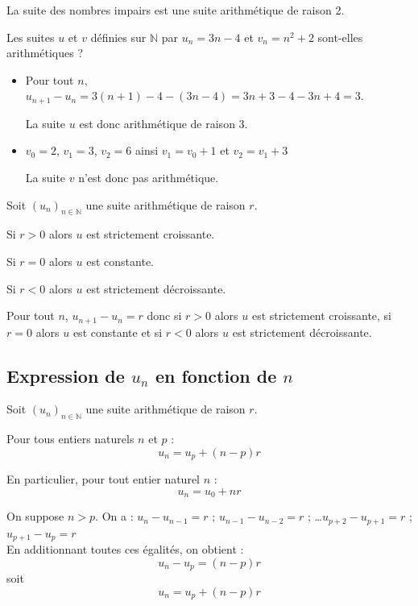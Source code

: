 \documentclass[french]{book}
\newcommand{\N}{\mathbb {N}}
\newcommand{\suite}[1][u]{\left( #1_{n} \right)_{n\in\N}}
\begin{document}
\begin{exemple}
La suite des nombres impairs est une suite arithmétique de raison 2.

Les suites $u$ et $v$ définies sur $\N$ par $u_n=3n-4$ et $v_n=n^2+2$ sont-elles arithmétiques ?

\begin{itemize}
\item Pour tout $n$, $u_{n+1}-u_n=3(n+1)-4-(3n-4)=3n+3-4-3n+4=3$.

La suite $u$ est donc arithmétique de raison 3.

\item $v_0=2$, $v_1=3$, $v_2=6$ ainsi $v_1=v_0+1$ et $v_2=v_1+3$

La suite $v$ n'est donc pas arithmétique.
\end{itemize}
\end{exemple}

\vspace{2ex}
\begin{prop}
Soit $\suite[u]$ une suite arithmétique de raison $r$.
\par Si $r>0$ alors $u$ est strictement croissante.
\par Si $r=0$ alors $u$ est constante.
\par Si $r<0$ alors $u$ est strictement décroissante.
\end{prop}

\begin{demo}
Pour tout $n$, $u_{n+1}-u_n=r$
donc si  $r>0$ alors $u$ est strictement croissante, si $r=0$ alors $u$ est constante et si $r<0$ alors $u$ est strictement décroissante.
\end{demo}
\subsection{Expression de $u_n$ en fonction de $n$}
\begin{prop}
Soit $\suite[u]$ une suite arithmétique de raison $r$.
\par Pour tous entiers naturels $n$ et $p$ : \[u_n=u_p+(n-p)r\]
\par En particulier, pour tout entier naturel $n$ : \[u_n=u_0+nr\]
\end{prop}

\begin{demo}
On suppose $n>p$. On a : 
$u_{n}-u_{n-1}=r$ ; \hfill $u_{n-1}-u_{n-2}=r$ ; \hfill \dots \hfill $u_{p+2}-u_{p+1}=r$ ; \hfill $u_{p+1}-u_{p}=r$ \\
En additionnant toutes ces égalités, on obtient :
\[u_{n}-u_{p}=(n-p)r\]
soit \[u_n=u_p+(n-p)r\]
\end{demo}
\end{document}
